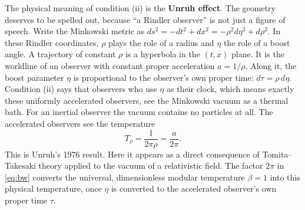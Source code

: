 The physical meaning of condition (ii) is the \textbf{Unruh effect}. The geometry deserves to be spelled out,
because ``a Rindler observer'' is not just a figure of speech. Write the Minkowski metric as
$ds^2=-dt^2+dx^2=-\rho^2d\eta^2+d\rho^2$. In these Rindler coordinates, $\rho$ plays the role of a radius and
$\eta$ the role of a boost angle. A trajectory of constant $\rho$ is a hyperbola in the $(t,x)$ plane. It is the
worldline of an observer with constant proper acceleration $a=1/\rho$. Along it, the boost parameter $\eta$ is
proportional to the observer's own proper time: $d\tau=\rho\,d\eta$. Condition (ii) says that observers who use
$\eta$ as their clock, which means exactly these uniformly accelerated observers, see the Minkowski vacuum as a
thermal bath. For an inertial observer the vacuum contains no particles at all. The accelerated observers see
the temperature
\[
T_\rho = \frac{1}{2\pi\rho} = \frac{a}{2\pi} .
\]
This is Unruh's 1976 result. Here it appears as a direct consequence of Tomita--Takesaki theory applied to the
vacuum of a relativistic field. The factor $2\pi$ in \eqref{eq:bw} converts the universal, dimensionless modular
temperature $\beta=1$ into this physical temperature, once $\eta$ is converted to the accelerated observer's own
proper time $\tau$.

